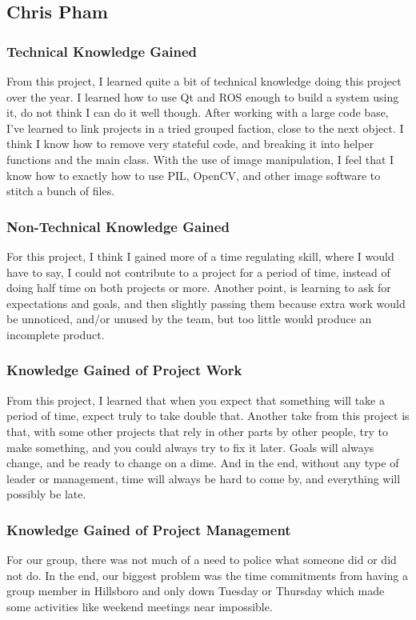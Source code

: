 \subsection{Chris Pham}
\subsubsection{Technical Knowledge Gained}
From this project, I learned quite a bit of technical knowledge doing this project over the year.
I learned how to use Qt and ROS enough to build a system using it, do not think I can do it well though.
After working with a large code base, I've learned to link projects in a tried grouped faction, close to the next object.
I think I know how to remove very stateful code, and breaking it into helper functions and the main class.
With the use of image manipulation, I feel that I know how to exactly how to use PIL, OpenCV, and other image software to stitch a bunch of files.
\subsubsection{Non-Technical Knowledge Gained}
For this project, I think I gained more of a time regulating skill, where I would have to say, I could not contribute to a project for a period of time, instead of doing half time on both projects or more.
Another point, is learning to ask for expectations and goals, and then slightly passing them because extra work would be unnoticed, and/or unused by the team, but too little would produce an incomplete product.
\subsubsection{Knowledge Gained of Project Work}
From this project, I learned that when you expect that something will take a period of time, expect truly to take double that.
Another take from this project is that, with some other projects that rely in other parts by other people, try to make something, and you could always try to fix it later.
Goals will always change, and be ready to change on a dime.
And in the end, without any type of leader or management, time will always be hard to come by, and everything will possibly be late.
\subsubsection{Knowledge Gained of Project Management}
For our group, there was not much of a need to police what someone did or did not do.
In the end, our biggest problem was the time commitments from having a group member in Hillsboro and only down Tuesday or Thursday which made some activities like weekend meetings near impossible.
